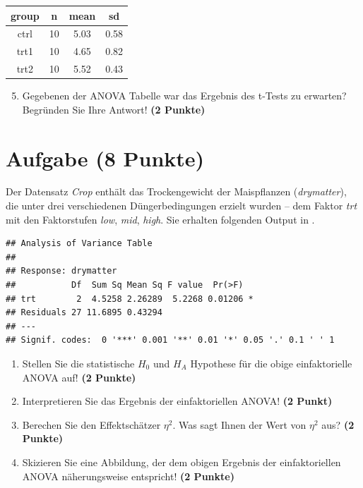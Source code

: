 \documentclass[a4paper, 10pt]{scrartcl}\usepackage[]{graphicx}\usepackage[]{xcolor}
\makeatletter
\newenvironment{kframe}{%
 \def\at@end@of@kframe{}%
 \ifinner\ifhmode%
  \def\at@end@of@kframe{\end{minipage}}%
  \begin{minipage}{\columnwidth}%
 \fi\fi%
 \def\FrameCommand##1{\hskip\@totalleftmargin \hskip-\fboxsep
 \colorbox{shadecolor}{##1}\hskip-\fboxsep
     \hskip-\linewidth \hskip-\@totalleftmargin \hskip\columnwidth}%
 \MakeFramed {\advance\hsize-\width
   \@totalleftmargin\z@ \linewidth\hsize
   \@setminipage}}%
 {\par\unskip\endMakeFramed%
 \at@end@of@kframe}
\newenvironment{knitrout}{}{} %
\makeatother
\begin{document}
\begin{knitrout}
\color{fgcolor}\begin{table}[!h]
\centering
\begin{tabular}{cccc}
\toprule
group & n & mean & sd\\
\midrule
ctrl & 10 & 5.03 & 0.58\\
trt1 & 10 & 4.65 & 0.82\\
trt2 & 10 & 5.52 & 0.43\\
\bottomrule
\end{tabular}
\end{table}

\end{knitrout}

\begin{enumerate}
  \setcounter{enumi}{4}
\item Gegebenen der ANOVA Tabelle war das Ergebnis des t-Tests zu erwarten?
  Begr{\"u}nden Sie Ihre Antwort! \textbf{(2 Punkte)}
\end{enumerate}

 
\clearpage

\section{Aufgabe \hfill (8 Punkte)}


Der Datensatz \textit{Crop} enth{\"a}lt das Trockengewicht der
Maispflanzen (\textit{drymatter}), die unter drei 
verschiedenen D{\"u}ngerbedingungen erzielt wurden -- dem Faktor
\textit{trt} mit den Faktorstufen \textit{low}, \textit{mid},
\textit{high}. Sie erhalten folgenden Output in \Rlogo.

\begin{knitrout}
\color{fgcolor}\begin{kframe}
\begin{verbatim}
## Analysis of Variance Table
## 
## Response: drymatter
##           Df  Sum Sq Mean Sq F value  Pr(>F)  
## trt        2  4.5258 2.26289  5.2268 0.01206 *
## Residuals 27 11.6895 0.43294                  
## ---
## Signif. codes:  0 '***' 0.001 '**' 0.01 '*' 0.05 '.' 0.1 ' ' 1
\end{verbatim}
\end{kframe}
\end{knitrout}

\begin{enumerate}
\item Stellen Sie die statistische $H_0$ und $H_A$ Hypothese f{\"u}r die obige
  einfaktorielle ANOVA auf! \textbf{(2 Punkte)}
\item Interpretieren Sie das Ergebnis der einfaktoriellen ANOVA! \textbf{(2 Punkt)} 
\item Berechen Sie den Effektsch{\"a}tzer $\eta^2$. Was sagt Ihnen der Wert von
  $\eta^2$ aus? \textbf{(2 Punkte)}
\item Skizieren Sie eine Abbildung, der dem obigen Ergebnis der
  einfaktoriellen ANOVA n{\"a}herungsweise entspricht! \textbf{(2 Punkte)}
\end{enumerate}
\end{document}
